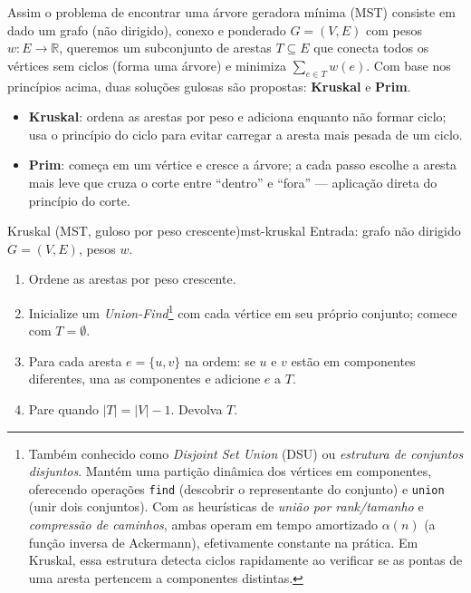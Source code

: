 \documentclass[12pt,a4paper]{article}
\begin{document}
Assim o problema de encontrar uma árvore geradora mínima (MST) consiste em dado um grafo (não dirigido), conexo e ponderado \(G=(V,E)\) com pesos \(w:E\to\mathbb{R}\), queremos um subconjunto de arestas \(T\subseteq E\) que conecta todos os vértices sem ciclos (forma uma árvore) e minimiza \(\sum_{e\in T} w(e)\). 
Com base nos princípios acima, duas soluções gulosas são propostas: \textbf{Kruskal} e \textbf{Prim}.

\begin{itemize}\setlength{\itemsep}{2pt}
    \item \textbf{Kruskal}: ordena as arestas por peso e adiciona enquanto não formar ciclo; usa o princípio do ciclo para evitar carregar a aresta mais pesada de um ciclo.
    \item \textbf{Prim}: começa em um vértice e cresce a árvore; a cada passo escolhe a aresta mais leve que cruza o corte entre “dentro” e “fora” — aplicação direta do princípio do corte.
\end{itemize}


\begin{algobox}{Kruskal (MST, guloso por peso crescente)}{mst-kruskal}
Entrada: grafo não dirigido \(G=(V,E)\), pesos \(w\).
\begin{enumerate}\setlength{\itemsep}{2pt}
    \item Ordene as arestas por peso crescente.
    \item Inicialize um \emph{Union-Find}\footnote{Também conhecido como \emph{Disjoint Set Union} (DSU) ou \emph{estrutura de conjuntos disjuntos}. Mantém uma partição dinâmica dos vértices em componentes, oferecendo operações \texttt{find} (descobrir o representante do conjunto) e \texttt{union} (unir dois conjuntos). Com as heurísticas de \emph{união por rank/tamanho} e \emph{compressão de caminhos}, ambas operam em tempo amortizado \(\alpha(n)\) (a função inversa de Ackermann), efetivamente constante na prática. Em Kruskal, essa estrutura detecta ciclos rapidamente ao verificar se as pontas de uma aresta pertencem a componentes distintas.} com cada vértice em seu próprio conjunto; comece com \(T=\emptyset\).
    \item Para cada aresta \(e=\{u,v\}\) na ordem: se \(u\) e \(v\) estão em componentes diferentes, una as componentes e adicione \(e\) a \(T\).
    \item Pare quando \(|T|=|V|-1\). Devolva \(T\).
\end{enumerate}
\end{algobox}
\end{document}
